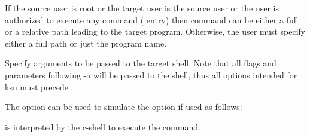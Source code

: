 \documentclass[letterpaper,10pt,english]{sphinxmanual}
\begin{document}
\begin{description}
If the source user is root or the target user is the source user
or the user is authorized to execute any command (\sphinxcode{*} entry)
then command can be either a full or a relative path leading to
the target program.  Otherwise, the user must specify either a
full path or just the program name.

\item[{\sphinxstylestrong{-a} \sphinxstyleemphasis{args}}] \leavevmode
Specify arguments to be passed to the target shell.  Note that all
flags and parameters following -a will be passed to the shell,
thus all options intended for ksu must precede .

The  option can be used to simulate the  option if
used as follows:

%
\begin{sphinxVerbatim}[commandchars=\\\{\}]
  \PYG{p}{[} \PYG{p}{[}\PYG{p}{]}\PYG{p}{]}
\end{sphinxVerbatim}

 is interpreted by the c-shell to execute the command.

\end{description}
\end{document}
